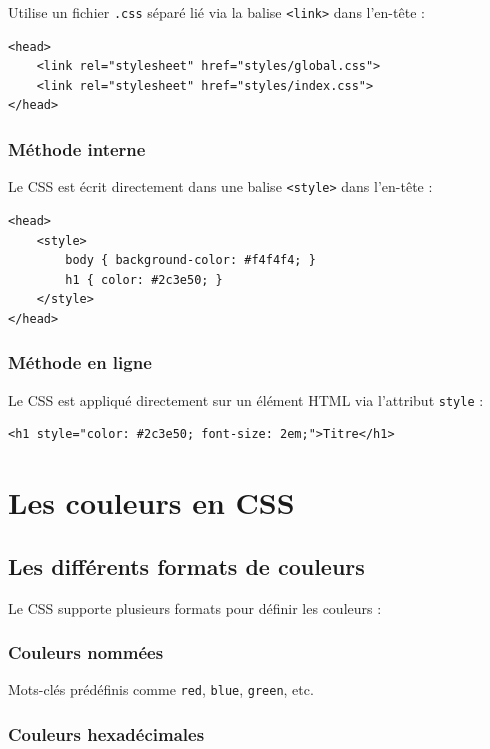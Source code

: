 \documentclass[12pt,a4paper]{article}
\begin{document}
Utilise un fichier \texttt{.css} séparé lié via la balise \texttt{<link>} dans l'en-tête :

\begin{lstlisting}
<head>
    <link rel="stylesheet" href="styles/global.css">
    <link rel="stylesheet" href="styles/index.css">
</head>
\end{lstlisting}

\subsubsection{Méthode interne}

Le CSS est écrit directement dans une balise \texttt{<style>} dans l'en-tête :

\begin{lstlisting}
<head>
    <style>
        body { background-color: #f4f4f4; }
        h1 { color: #2c3e50; }
    </style>
</head>
\end{lstlisting}

\subsubsection{Méthode en ligne}

Le CSS est appliqué directement sur un élément HTML via l'attribut \texttt{style} :

\begin{lstlisting}
<h1 style="color: #2c3e50; font-size: 2em;">Titre</h1>
\end{lstlisting}

\section{Les couleurs en CSS}

\subsection{Les différents formats de couleurs}

Le CSS supporte plusieurs formats pour définir les couleurs :

\subsubsection{Couleurs nommées}

Mots-clés prédéfinis comme \texttt{red}, \texttt{blue}, \texttt{green}, etc.

\subsubsection{Couleurs hexadécimales}
\end{document}
